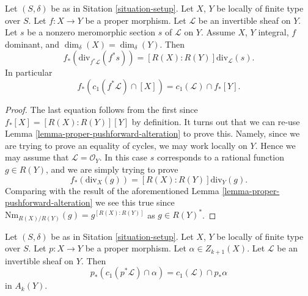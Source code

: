 \begin{lemma}
\label{lemma-equal-c1-as-cycles}
Let $(S, \delta)$ be as in Sitation \ref{situation-setup}.
Let $X$, $Y$ be locally of finite type over $S$.
Let $f : X \to Y$ be a proper morphism.
Let $\mathcal{L}$ be an invertible sheaf on $Y$.
Let $s$ be a nonzero meromorphic section $s$ of $\mathcal{L}$ on $Y$.
Assume $X$, $Y$ integral, $f$ dominant, and $\dim_\delta(X) = \dim_\delta(Y)$.
Then
$$
f_*\left(\text{div}_{f^*\mathcal{L}}(f^*s)\right) =
[R(X) : R(Y)]\text{div}_{\mathcal{L}}(s).
$$
In particular
$$
f_*(c_1(f^*\mathcal{L}) \cap [X]) = c_1(\mathcal{L}) \cap f_*[Y].
$$
\end{lemma}

\begin{proof}
The last equation follows from the first since $f_*[X] = [R(X) : R(Y)][Y]$
by definition. It turns out that we can re-use
Lemma \ref{lemma-proper-pushforward-alteration}
to prove this. Namely, since we are trying to prove an equality
of cycles, we may work locally on $Y$. Hence we may assume
that $\mathcal{L} = \mathcal{O}_Y$. In this case $s$
corresponds to a rational function $g \in R(Y)$, and
we are simply trying to prove
$$
f_*\left(\text{div}_X(g)\right) =
[R(X) : R(Y)]\text{div}_Y(g).
$$
Comparing with the result of the aforementioned
Lemma \ref{lemma-proper-pushforward-alteration}
we see this true since
$\text{Nm}_{R(X)/R(Y)}(g) = g^{[R(X) : R(Y)]}$
as $g \in R(Y)^*$.
\end{proof}

\begin{lemma}
\label{lemma-pushforward-cap-c1}
Let $(S, \delta)$ be as in Sitation \ref{situation-setup}.
Let $X$, $Y$ be locally of finite type over $S$.
Let $p : X \to Y$ be a proper morphism.
Let $\alpha \in Z_{k + 1}(X)$.
Let $\mathcal{L}$ be an invertible sheaf on $Y$.
Then
$$
p_*(c_1(p^*\mathcal{L}) \cap \alpha) = c_1(\mathcal{L}) \cap p_*\alpha
$$
in $A_k(Y)$.
\end{lemma}

